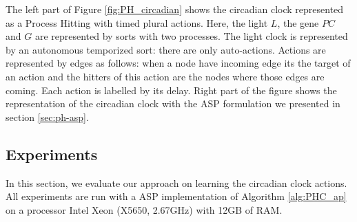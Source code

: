 The left part of Figure \ref{fig:PH_circadian} shows the circadian clock represented as a Process Hitting with timed plural actions.
Here, the light $L$, the gene $PC$ and $G$ are represented by sorts with two processes.
The light clock is represented by an autonomous temporized sort: there are only auto-actions.
Actions are represented by edges as follows: when a node have incoming edge its the target of an action and the hitters of this action are the nodes where those edges are coming.
Each action is labelled by its delay.
Right part of the figure shows the representation of the circadian clock with the ASP formulation we presented in section \ref{sec:ph-asp}.



\subsection{Experiments}

In this section, we evaluate our approach on learning the circadian clock actions.
All experiments are run with a ASP implementation of Algorithm \ref{alg:PHC_ap} on a processor Intel Xeon (X5650, 2.67GHz) with 12GB of RAM.

